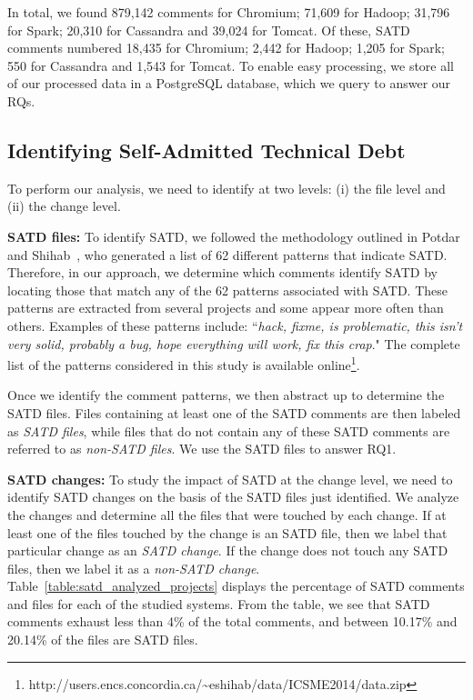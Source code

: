 In total, we found 879,142 comments for Chromium; 71,609 for Hadoop; 31,796 for Spark; 20,310 for Cassandra and 39,024 for Tomcat. Of these, SATD comments numbered 18,435 for Chromium; 2,442 for Hadoop; 1,205 for Spark; 550 for Cassandra and 1,543 for Tomcat. To enable easy processing, we store all of our processed data in a PostgreSQL database, which we query to answer our RQs.


\subsection{Identifying Self-Admitted Technical Debt}
\label{ch3_td}
To perform our analysis, we need to identify \SATD at two levels: (i) the file level and (ii) the change level.



\noindent\textbf{SATD files:} To identify SATD, we followed the methodology outlined in Potdar and Shihab~\cite{ICSM_PotdarS14}, who generated a list of 62 different patterns that indicate SATD. Therefore, in our approach, we determine which comments identify SATD by locating those that match any of the 62 patterns associated with SATD. These patterns are extracted from several projects and some appear more often than others. Examples of these patterns include: ``\textit{hack, fixme, is problematic, this isn't very solid, probably a bug, hope everything will work, fix this crap}." The complete list of the patterns considered in this study is available online\footnote{http://users.encs.concordia.ca/\textasciitilde eshihab/data/ICSME2014/data.zip}.

Once we identify the comment patterns, we then abstract up to determine the SATD files. Files containing at least one of the SATD comments are then labeled as {\em SATD files}, while files that do not contain any of these SATD comments are referred to as {\em non-SATD files}. We use the SATD files to answer RQ1.

\noindent\textbf{SATD changes:}
To study the impact of SATD at the change level, we need to identify SATD changes on the basis of the SATD files just identified. We analyze the changes and determine all the files that were touched by each change. If at least one of the files touched by the change is an SATD file, then we label that particular change as an \textit{SATD change}. If the change does not touch any SATD files, then we label it as a \textit{non-SATD change}. Table~\ref{table:satd_analyzed_projects} displays the percentage of SATD comments and files for each of the studied systems. From the table, we see that SATD comments exhaust less than 4\% of the total comments, and between 10.17\% and 20.14\% of the files are SATD files.

